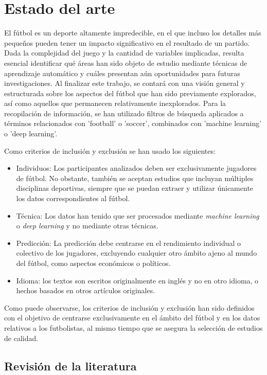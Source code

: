 \chapter{Estado del arte}

El fútbol es un deporte altamente impredecible, en el que incluso los detalles más pequeños pueden tener un impacto significativo en el resultado de un partido. Dada la complejidad del juego y la cantidad de variables implicadas, resulta esencial identificar qué áreas han sido objeto de estudio mediante técnicas de aprendizaje automático y cuáles presentan aún oportunidades para futuras investigaciones. Al finalizar este trabajo, se contará con una visión general y estructurada sobre los aspectos del fútbol que han sido previamente explorados, así como aquellos que permanecen relativamente inexplorados. Para la recopilación de información, se han utilizado filtros de búsqueda aplicados a términos relacionados con 'football' o 'soccer', combinados con 'machine learning' o 'deep learning'.

Como criterios de inclusión y exclusión se han usado los siguientes:
\begin{itemize}
    \item Individuos: Los participantes analizados deben ser exclusivamente jugadores de fútbol. No obstante, también se aceptan estudios que incluyan múltiples disciplinas deportivas, siempre que se puedan extraer y utilizar únicamente los datos correspondientes al fútbol.
    \item Técnica: Los datos han tenido que ser procesados mediante \textit{machine learning} o \textit{deep learning} y no mediante otras técnicas.
    \item Predicción: La predicción debe centrarse en el rendimiento individual o colectivo de los jugadores, excluyendo cualquier otro ámbito ajeno al mundo del fútbol, como aspectos económicos o políticos.
    \item Idioma: los textos son escritos originalmente en inglés y no en otro idioma, o hechos basados en otros artículos originales.
\end{itemize}

Como puede observarse, los criterios de inclusión y exclusión han sido definidos con el objetivo de centrarse exclusivamente en el ámbito del fútbol y en los datos relativos a los futbolistas, al mismo tiempo que se asegura la selección de estudios de calidad.

\section{Revisión de la literatura}

